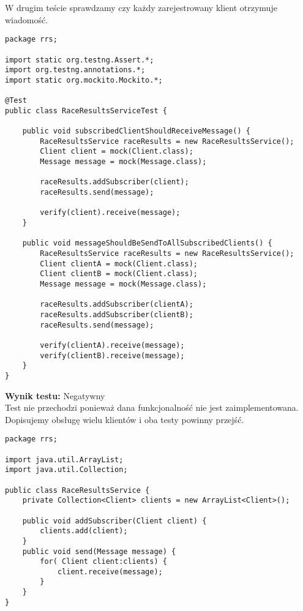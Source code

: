 \documentclass[a4paper,12pt,twoside]{article}
\begin{document}
W drugim teście sprawdzamy czy każdy zarejestrowany klient otrzymuje wiadomość.

\begin{lstlisting}
package rrs;

import static org.testng.Assert.*;
import org.testng.annotations.*;
import static org.mockito.Mockito.*;

@Test
public class RaceResultsServiceTest {
    
    public void subscribedClientShouldReceiveMessage() {
        RaceResultsService raceResults = new RaceResultsService();
        Client client = mock(Client.class);
        Message message = mock(Message.class);
        
        raceResults.addSubscriber(client);
        raceResults.send(message);
        
        verify(client).receive(message);
    }
    
    public void messageShouldBeSendToAllSubscribedClients() {
        RaceResultsService raceResults = new RaceResultsService();
        Client clientA = mock(Client.class);
        Client clientB = mock(Client.class);
        Message message = mock(Message.class);
        
        raceResults.addSubscriber(clientA);
        raceResults.addSubscriber(clientB);
        raceResults.send(message);
        
        verify(clientA).receive(message);
        verify(clientB).receive(message);
    }
}
\end{lstlisting}

\noindent
\textbf{Wynik testu: }{\color{red} Negatywny}\\

Test nie przechodzi ponieważ dana funkcjonalność nie jest zaimplementowana.
Dopisujemy obsługę wielu klientów i oba testy powinny przejść.

\begin{lstlisting}
package rrs;

import java.util.ArrayList;
import java.util.Collection;

public class RaceResultsService {
    private Collection<Client> clients = new ArrayList<Client>();
    
    public void addSubscriber(Client client) {
        clients.add(client);
    }
    public void send(Message message) {
        for( Client client:clients) {
            client.receive(message);
        }
    }
}
\end{lstlisting}
\end{document}
